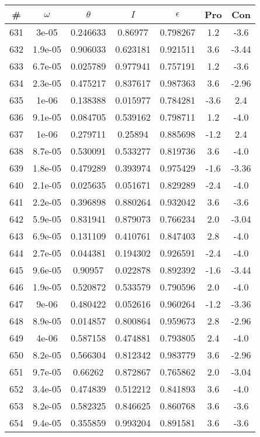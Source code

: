 \begin{table}
\begin{tabular}{c|c|c|c|c|c|c}
\# & $\omega$ & $\theta$ & $I$ & $\epsilon$ & Pro & Con\\
\hline
631 & 3e-05 & 0.246633 & 0.86977 & 0.798267 & 1.2 & -3.6\\
632 & 1.9e-05 & 0.906033 & 0.623181 & 0.921511 & 3.6 & -3.44\\
633 & 6.7e-05 & 0.025789 & 0.977941 & 0.757191 & 1.2 & -3.6\\
634 & 2.3e-05 & 0.475217 & 0.837617 & 0.987363 & 3.6 & -2.96\\
635 & 1e-06 & 0.138388 & 0.015977 & 0.784281 & -3.6 & 2.4\\
636 & 9.1e-05 & 0.084705 & 0.539162 & 0.798711 & 1.2 & -4.0\\
637 & 1e-06 & 0.279711 & 0.25894 & 0.885698 & -1.2 & 2.4\\
638 & 8.7e-05 & 0.530091 & 0.533277 & 0.819736 & 3.6 & -4.0\\
639 & 1.8e-05 & 0.479289 & 0.393974 & 0.975429 & -1.6 & -3.36\\
640 & 2.1e-05 & 0.025635 & 0.051671 & 0.829289 & -2.4 & -4.0\\
641 & 2.2e-05 & 0.396898 & 0.880264 & 0.932042 & 3.6 & -3.6\\
642 & 5.9e-05 & 0.831941 & 0.879073 & 0.766234 & 2.0 & -3.04\\
643 & 6.9e-05 & 0.131109 & 0.410761 & 0.847403 & 2.8 & -4.0\\
644 & 2.7e-05 & 0.044381 & 0.194302 & 0.926591 & -2.4 & -4.0\\
645 & 9.6e-05 & 0.90957 & 0.022878 & 0.892392 & -1.6 & -3.44\\
646 & 1.9e-05 & 0.520872 & 0.533579 & 0.790596 & 2.0 & -4.0\\
647 & 9e-06 & 0.480422 & 0.052616 & 0.960264 & -1.2 & -3.36\\
648 & 8.9e-05 & 0.014857 & 0.800864 & 0.959673 & 2.8 & -2.96\\
649 & 4e-06 & 0.587158 & 0.474881 & 0.793805 & 2.4 & -4.0\\
650 & 8.2e-05 & 0.566304 & 0.812342 & 0.983779 & 3.6 & -2.96\\
651 & 9.7e-05 & 0.66262 & 0.872867 & 0.765862 & 2.0 & -3.04\\
652 & 3.4e-05 & 0.474839 & 0.512212 & 0.841893 & 3.6 & -4.0\\
653 & 8.2e-05 & 0.582325 & 0.846625 & 0.860768 & 3.6 & -3.6\\
654 & 9.4e-05 & 0.355859 & 0.993204 & 0.891581 & 3.6 & -3.6\\

\end{tabular}
\end{table}
